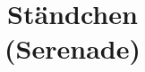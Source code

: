 \documentclass{article}         %
\begin{document}


\def\interscoreline{\vskip3mm}
\title{St\"andchen\normalsize\\[2ex](Serenade)}
\maketit
\def\startbar#1{}%

\end{document}
